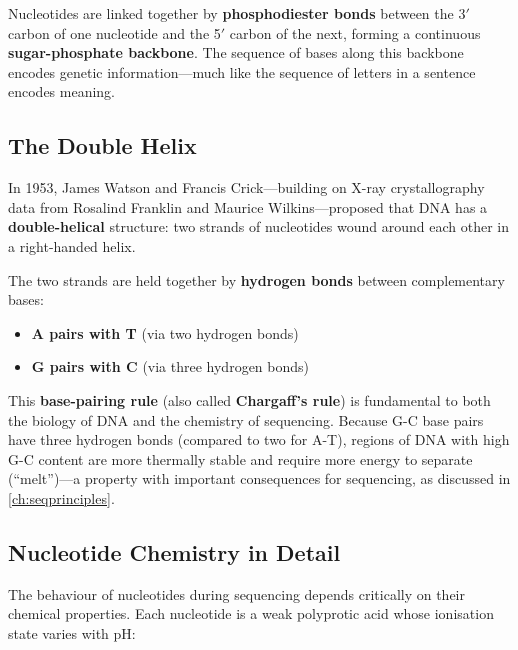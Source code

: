 Nucleotides are linked together by \textbf{phosphodiester bonds} between the 3$'${} carbon of one nucleotide and the 5$'${} carbon of the next, forming a continuous \textbf{sugar-phosphate backbone}. The sequence of bases along this backbone encodes genetic information---much like the sequence of letters in a sentence encodes meaning.

\subsection{The Double Helix}
\label{subsec:molbio:double-helix}

In 1953, James Watson and Francis Crick---building on X-ray crystallography data from Rosalind Franklin and Maurice Wilkins---proposed that DNA has a \textbf{double-helical} structure: two strands of nucleotides wound around each other in a right-handed helix.

The two strands are held together by \textbf{hydrogen bonds} between complementary bases:
\begin{itemize}[itemsep=2pt]
  \item \textbf{A pairs with T} (via two hydrogen bonds)
  \item \textbf{G pairs with C} (via three hydrogen bonds)
\end{itemize}

This \textbf{base-pairing rule} (also called \textbf{Chargaff's rule}) is fundamental to both the biology of DNA and the chemistry of sequencing. Because G-C base pairs have three hydrogen bonds (compared to two for A-T), regions of DNA with high G-C content are more thermally stable and require more energy to separate (``melt'')---a property with important consequences for sequencing, as discussed in \cref{ch:seqprinciples}.

\subsection{Nucleotide Chemistry in Detail}
\label{subsec:molbio:nucleotide-chemistry}

The behaviour of nucleotides during sequencing depends critically on their chemical properties. Each nucleotide is a weak polyprotic acid whose ionisation state varies with pH:


